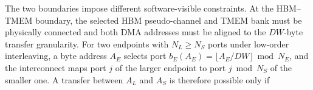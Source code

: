 \documentclass[sigconf,anonymous,nonacm]{acmart}
\newcommand{\ours}{\textsc{FINISH}}
\begin{document}

The two boundaries impose different software-visible constraints. At the HBM--TMEM boundary, the selected HBM pseudo-channel and TMEM bank must be physically connected and both DMA addresses must be aligned to the $DW$-byte transfer granularity. For two endpoints with $N_L \geq N_S$ ports under low-order interleaving, a byte address $A_E$ selects port $b_E(A_E)=\lfloor A_E/DW \rfloor \bmod N_E$, and the interconnect maps port $j$ of the larger endpoint to port $j \bmod N_S$ of the smaller one. A transfer between $A_L$ and $A_S$ is therefore possible only if
\end{document}
